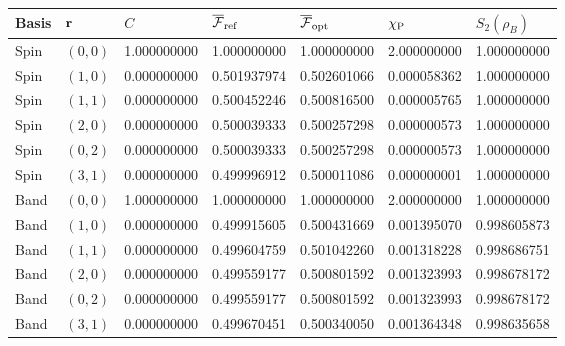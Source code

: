 \begin{tabular}{lllllll}
\toprule
Basis & $\mathbf r$ & $C$ & $\overline{\mathcal F}_{\rm ref}$ & $\overline{\mathcal F}_{\rm opt}$ & $\chi_{\rm P}$ & $S_2(\rho_B)$ \\
\midrule
Spin & $(0,0)$ & 1.000000000 & 1.000000000 & 1.000000000 & 2.000000000 & 1.000000000 \\
Spin & $(1,0)$ & 0.000000000 & 0.501937974 & 0.502601066 & 0.000058362 & 1.000000000 \\
Spin & $(1,1)$ & 0.000000000 & 0.500452246 & 0.500816500 & 0.000005765 & 1.000000000 \\
Spin & $(2,0)$ & 0.000000000 & 0.500039333 & 0.500257298 & 0.000000573 & 1.000000000 \\
Spin & $(0,2)$ & 0.000000000 & 0.500039333 & 0.500257298 & 0.000000573 & 1.000000000 \\
Spin & $(3,1)$ & 0.000000000 & 0.499996912 & 0.500011086 & 0.000000001 & 1.000000000 \\
Band & $(0,0)$ & 1.000000000 & 1.000000000 & 1.000000000 & 2.000000000 & 1.000000000 \\
Band & $(1,0)$ & 0.000000000 & 0.499915605 & 0.500431669 & 0.001395070 & 0.998605873 \\
Band & $(1,1)$ & 0.000000000 & 0.499604759 & 0.501042260 & 0.001318228 & 0.998686751 \\
Band & $(2,0)$ & 0.000000000 & 0.499559177 & 0.500801592 & 0.001323993 & 0.998678172 \\
Band & $(0,2)$ & 0.000000000 & 0.499559177 & 0.500801592 & 0.001323993 & 0.998678172 \\
Band & $(3,1)$ & 0.000000000 & 0.499670451 & 0.500340050 & 0.001364348 & 0.998635658 \\
\bottomrule
\end{tabular}
